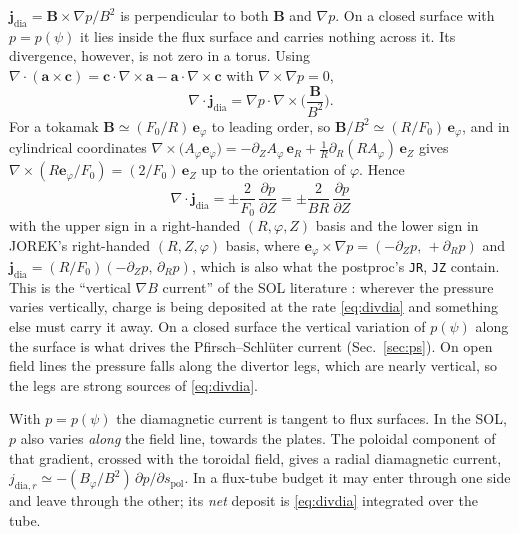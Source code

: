 \documentclass[11pt,a4paper]{article}
\newcommand{\bB}{\mathbf{B}}
\newcommand{\ephi}{\mathbf{e}_\varphi}
\newcommand{\eR}{\mathbf{e}_R}
\newcommand{\eZ}{\mathbf{e}_Z}
\newcommand{\divg}{\nabla\!\cdot\!}
\newcommand{\jdia}{\mathbf{j}_{\mathrm{dia}}}
\newcommand{\code}[1]{\texttt{#1}}
\begin{document}
$\jdia = \bB\times\nabla p/B^2$ is perpendicular to both $\bB$ and $\nabla p$. On a closed surface with $p = p(\psi)$ it
lies inside the flux surface and carries nothing across it. Its divergence, however, is not zero in a torus. Using
$\divg(\mathbf{a}\times\mathbf{c}) = \mathbf{c}\cdot\nabla\times\mathbf{a} - \mathbf{a}\cdot\nabla\times\mathbf{c}$
with $\nabla\times\nabla p = 0$,
\begin{equation}
  \divg\jdia = \nabla p\cdot\nabla\times\Big(\frac{\bB}{B^2}\Big).
\end{equation}
For a tokamak $\bB \simeq (F_0/R)\,\ephi$ to leading order, so $\bB/B^2 \simeq (R/F_0)\,\ephi$, and in cylindrical
coordinates $\nabla\times\big(A_\varphi\ephi\big) = -\partial_Z A_\varphi\,\eR + \tfrac1R\partial_R(R A_\varphi)\,\eZ$
gives $\nabla\times(R\ephi/F_0) = (2/F_0)\,\eZ$ up to the orientation of $\varphi$. Hence
\begin{equation}
  \boxed{\;\divg\jdia = \pm\frac{2}{F_0}\,\frac{\partial p}{\partial Z} = \pm\frac{2}{B R}\,\frac{\partial p}{\partial Z}\;}
  \label{eq:divdia}
\end{equation}
with the upper sign in a right-handed $(R,\varphi,Z)$ basis and the lower sign in JOREK's right-handed $(R,Z,\varphi)$
basis, where $\ephi\times\nabla p = (-\partial_Z p,\,+\partial_R p)$ and $\jdia = (R/F_0)(-\partial_Z p,\,\partial_R p)$,
which is also what the postproc's \code{JR}, \code{JZ} contain.
This is the ``vertical $\nabla B$ current'' of the SOL literature \cite{rozhansky2001,zhao2026}: wherever the pressure
varies vertically, charge is being deposited at the rate \eqref{eq:divdia} and something else must carry it away. On a
closed surface the vertical variation of $p(\psi)$ along the surface is what drives the Pfirsch--Schl\"uter current
(Sec.~\ref{sec:ps}). On open field lines the pressure falls along the divertor legs, which are nearly vertical, so the
legs are strong sources of \eqref{eq:divdia}.

\begin{tcolorbox}[warn={Watch out: ``the diamagnetic current crosses flux surfaces'' is true on open lines}]
With $p = p(\psi)$ the diamagnetic current is tangent to flux surfaces. In the SOL, $p$ also varies \emph{along} the
field line, towards the plates. The poloidal component of that gradient, crossed with the toroidal field, gives a
radial diamagnetic current, $j_{\mathrm{dia},r} \simeq -(B_\varphi/B^2)\,\partial p/\partial s_{\mathrm{pol}}$.
In a flux-tube budget it may enter through one side and leave through the other; its \emph{net} deposit is
\eqref{eq:divdia} integrated over the tube.
\end{tcolorbox}
\end{document}
